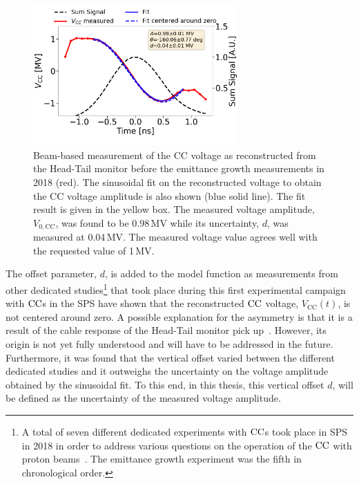 \begin{figure}[!h]
   \centering         
   \includegraphics[width=0.7\textwidth]{images/Ch5/HT_VCC_callibration_20180905_135033_sin_fit_fixed_freq_thesis_different_parameters.png}
       \caption{Beam-based measurement of the CC voltage as reconstructed from the Head-Tail monitor before the emittance growth measurements in 2018 (red). The sinusoidal fit on the reconstructed voltage to obtain the CC voltage amplitude is also shown (blue solid line). The fit result is given in the yellow box. The measured voltage amplitude, $V_\mathrm{0, CC}$, was found to be 0.98\,MV while its uncertainty, $d$, was measured at 0.04\,MV. The measured voltage value agrees well with the requested value of 1\,MV.}
       \label{fig:crabbing_sin_fit_MD5}
\end{figure}


The offset parameter, $d$, is added to the model function as measurements from other dedicated studies\footnote{A total of seven different dedicated experiments with ${\mathrm{CC}}$s took place in SPS in 2018 in order to address various questions on the operation of the ${\mathrm{CC}}$ with proton beams~\cite{BE_seminar}. The emittance growth experiment was the fifth in chronological order.} that took place during this first experimental campaign with ${\mathrm{CC}}$s in the SPS have shown that the reconstructed ${\mathrm{CC}}$ voltage, $V_\mathrm{CC}(t)$, is not centered around zero. %
A possible explanation for the asymmetry is that it is a result of the cable response of the Head-Tail monitor pick up~\cite{Levens_WP2_HT_CC_diagnostic}. However, its origin is not yet fully understood and will have to be addressed in the future. Furthermore, it was found that the vertical offset varied between the different dedicated studies and it outweighs the uncertainty on the voltage amplitude obtained by the sinusoidal fit. To this end, in this thesis, this vertical offset $d$, will be defined as the uncertainty of the measured voltage amplitude. 

